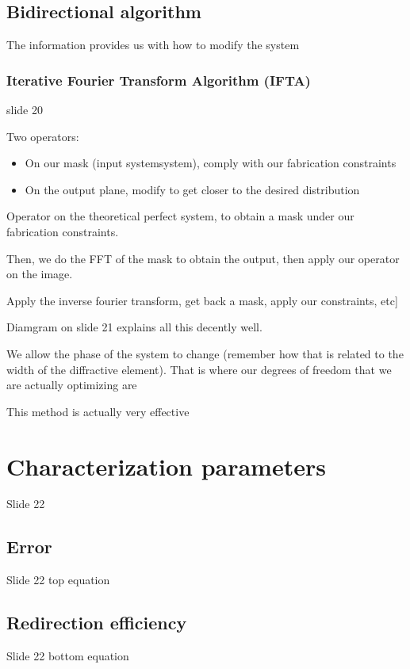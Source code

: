 \documentclass[../main/main.tex]{subfiles}
\begin{document}
\subsection{Bidirectional algorithm}

The information provides us with how to modify the system

\subsubsection{Iterative Fourier Transform Algorithm (IFTA)}
slide 20

Two operators:

\begin{itemize}
	\item On our mask (input systemsystem), comply with our fabrication constraints
	\item On the output plane, modify to get closer to the desired distribution
\end{itemize}

Operator on the theoretical perfect system, to obtain a mask under our fabrication constraints.

Then, we do the FFT  of the mask to obtain the output, then apply our operator on the image.

Apply the inverse fourier transform, get back a mask, apply our constraints, etc]

Diamgram on slide 21 explains all this decently well.

We allow the phase of the system to change (remember how that is related to the width of the diffractive element). That is where our degrees of freedom that we are actually optimizing are


This method is actually very effective

\section{Characterization parameters}
Slide 22

\subsection{Error}
Slide 22 top equation



\subsection{Redirection efficiency}
Slide 22 bottom equation
\end{document}
